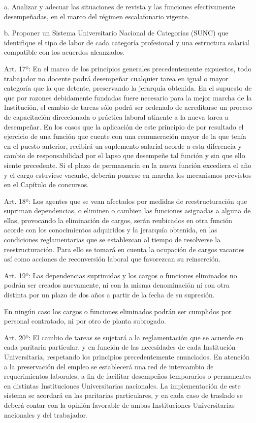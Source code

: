 \documentclass[]{article}
\begin{document}
a. Analizar y adecuar las situaciones de revista y las funciones
efectivamente desempeñadas, en el marco del régimen escalafonario
vigente.

b. Proponer un Sistema Universitario Nacional de Categorías (SUNC) que
identifique el tipo de labor de cada categoría profesional y una
estructura salarial compatible con los acuerdos alcanzados.

Art. 17º: En el marco de los principios generales precedentemente
expuestos, todo trabajador no docente podrá desempeñar cualquier tarea
en igual o mayor categoría que la que detente, preservando la jerarquía
obtenida. En el supuesto de que por razones debidamente fundadas fuere
necesario para la mejor marcha de la Institución, el cambio de tareas
sólo podrá ser ordenado de acreditarse un proceso de capacitación
direccionada o práctica laboral atinente a la nueva tarea a desempeñar.
En los casos que la aplicación de este principio de por resultado el
ejercicio de una función que cuente con una remuneración mayor de la que
tenía en el puesto anterior, recibirá un suplemento salarial acorde a
esta diferencia y cambio de responsabilidad por el lapso que desempeñe
tal función y sin que ello siente precedente. Si el plazo de permanencia
en la nueva función excediera el año y el cargo estuviese vacante,
deberán ponerse en marcha los mecanismos previstos en el Capítulo de
concursos.

Art. 18º: Los agentes que se vean afectados por medidas de
reestructuración que supriman dependencias, o eliminen o cambien las
funciones asignadas a alguna de ellas, provocando la eliminación de
cargos, serán reubicados en otra función acorde con los conocimientos
adquiridos y la jerarquía obtenida, en las condiciones reglamentarias
que se establezcan al tiempo de resolverse la reestructuración. Para
ello se tomará en cuenta la ocupación de cargos vacantes así como
acciones de reconversión laboral que favorezcan su reinserción.

Art. 19º: Las dependencias suprimidas y los cargos o funciones
eliminados no podrán ser creados nuevamente, ni con la misma
denominación ni con otra distinta por un plazo de dos años a partir de
la fecha de su supresión.

En ningún caso los cargos o funciones eliminados podrán ser cumplidos
por personal contratado, ni por otro de planta subrogado.

Art. 20º: El cambio de tareas se sujetará a la reglamentación que se
acuerde en cada paritaria particular, y en función de las necesidades de
cada Institución Universitaria, respetando los principios
precedentemente enunciados. En atención a la preservación del empleo se
establecerá una red de intercambio de requerimientos laborales, a fin de
facilitar desempeños temporarios o permanentes en distintas
Instituciones Universitarias nacionales. La implementación de este
sistema se acordará en las paritarias particulares, y en cada caso de
traslado se deberá contar con la opinión favorable de ambas
Instituciones Universitarias nacionales y del trabajador.
\end{document}
